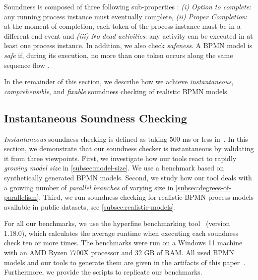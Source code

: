 \documentclass[runningheads]{llncs}
\begin{document}
Soundness is composed of three following sub-properties \cite{corradiniClassificationBPMNCollaborations2018}:
\textit{(i) Option to complete}: any running process instance must eventually complete,
\textit{(ii) Proper Completion}: at the moment of completion, each token of the process instance must be in a different end event and
\textit{(iii) No dead activities}: any activity can be executed in at least one process instance.
In addition, we also check \textit{safeness}.
A BPMN model is \textit{safe} if, during its execution, no more than one token occurs along the same sequence flow \cite{corradiniClassificationBPMNCollaborations2018}.

In the remainder of this section, we describe how we achieve \textit{instantaneous}, \textit{comprehensible}, and \textit{fixable} soundness checking of realistic BPMN models.


\subsection{Instantaneous Soundness Checking} \label{subsec:instantaneous}
\textit{Instantaneous} soundness checking is defined as taking 500 ms or less in~\cite{fahlandAnalysisDemandInstantaneous2011}.
In this section, we demonstrate that our soundness checker is instantaneous by validating it from three viewpoints.
First, we investigate how our tools react to rapidly \textit{growing model size} in \autoref{subsec:model-size}.
We use a benchmark based on synthetically generated BPMN models.
Second, we study how our tool deals with a growing number of \textit{parallel branches} of varying size in \autoref{subsec:degrees-of-parallelism}.
Third, we run soundness checking for realistic BPMN process models available in public datasets, see \autoref{subsec:realistic-models}.

For all our benchmarks, we use the hyperfine benchmarking tool~\cite{peterHyperfine2023} (version 1.18.0), which calculates the average runtime when executing each soundness check ten or more times.
The benchmarks were run on a Windows 11 machine with an AMD Ryzen 7700X processor and 32 GB of RAM.
All used BPMN models and our tools to generate them are given in the artifacts of this paper~\cite{noauthorgivenBPM2024Artifacts2024}.
Furthermore, we provide the scripts to replicate our benchmarks.
\end{document}
